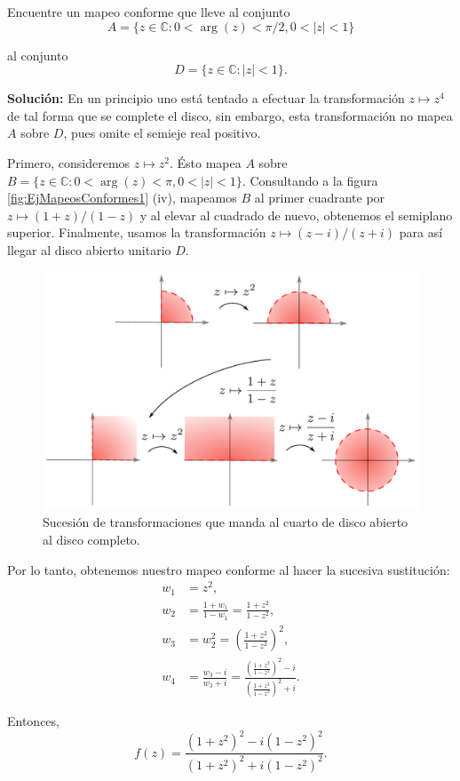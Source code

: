 \begin{ejemplo}
Encuentre un mapeo conforme que lleve al conjunto
$$A = \{z \in \mathbb{C} : 0 < \arg(z) < \pi/2, 0 < |z| < 1 \}$$

al conjunto
$$D = \{ z \in \mathbb{C} : |z| < 1\}.$$

\textbf{Solución:} En un principio uno está tentado a efectuar la transformación $z \mapsto z^4$ de tal forma que se complete el disco, sin embargo, esta transformación no mapea $A$ sobre $D$, pues omite el semieje real positivo.

Primero, consideremos $z \mapsto z^2$. Ésto mapea $A$ sobre $B = \{z \in \mathbb{C}: 0 < \arg(z) < \pi, 0 < |z| < 1\}$. Consultando a la figura \ref{fig:EjMapeosConformes1} (iv), mapeamos $B$ al primer cuadrante por $z \mapsto (1+z)/(1-z)$ y al elevar al cuadrado de nuevo, obtenemos el semiplano superior. Finalmente, usamos la transformación $z \mapsto (z-i)/(z+i)$ para así llegar al disco abierto unitario $D$.

\begin{figure}[H]
    \centering
    \includegraphics[scale = 0.6]{Figuras/MapeoConforme7.pdf}
    \caption{Sucesión de transformaciones que manda al cuarto de disco abierto al disco completo.}
    \label{fig:EjMapConformal}
\end{figure}

Por lo tanto, obtenemos nuestro mapeo conforme al hacer la sucesiva sustitución:
\begin{align*}
    w_1 &= z^2, \\
    w_2 &= \frac{1 + w_1}{1-w_1} = \frac{1+z^2}{1-z^2}, \\
    w_3 &= w_2^2 = \left( \frac{1+z^2}{1-z^2}\right)^2, \\
    w_4 &= \frac{w_3-i}{w_3 + i} = \frac{\left( \frac{1+z^2}{1-z^2}\right)^2 - i}{\left( \frac{1+z^2}{1-z^2}\right)^2+i}.
\end{align*}

Entonces,
$$f(z) = \frac{(1+z^2)^2 - i (1-z^2)^2}{(1+z^2)^2 + i (1-z^2)^2}.$$
\end{ejemplo}

